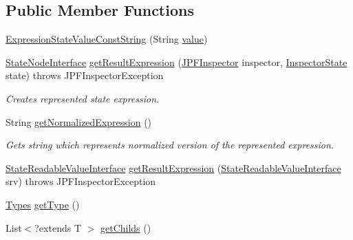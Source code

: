 \subsection*{Public Member Functions}
\begin{DoxyCompactItemize}
\item 
\hyperlink{classgov_1_1nasa_1_1jpf_1_1inspector_1_1server_1_1expression_1_1expressions_1_1_expression_state_value_const_string_abea513aa9ed18d5926a11c186a887f17}{Expression\+State\+Value\+Const\+String} (String \hyperlink{classgov_1_1nasa_1_1jpf_1_1inspector_1_1server_1_1expression_1_1expressions_1_1_expression_state_value_const_string_ac4c2de5d71c2fa57cb8029d1fde8e437}{value})
\item 
\hyperlink{interfacegov_1_1nasa_1_1jpf_1_1inspector_1_1server_1_1programstate_1_1_state_node_interface}{State\+Node\+Interface} \hyperlink{classgov_1_1nasa_1_1jpf_1_1inspector_1_1server_1_1expression_1_1expressions_1_1_expression_state_value_const_string_abae7eb766144fbb9a11336bb9053ad4a}{get\+Result\+Expression} (\hyperlink{classgov_1_1nasa_1_1jpf_1_1inspector_1_1server_1_1jpf_1_1_j_p_f_inspector}{J\+P\+F\+Inspector} inspector, \hyperlink{interfacegov_1_1nasa_1_1jpf_1_1inspector_1_1server_1_1expression_1_1_inspector_state}{Inspector\+State} state)  throws J\+P\+F\+Inspector\+Exception 
\begin{DoxyCompactList}\small\item\em Creates represented state expression. \end{DoxyCompactList}\item 
String \hyperlink{classgov_1_1nasa_1_1jpf_1_1inspector_1_1server_1_1expression_1_1expressions_1_1_expression_state_value_const_string_af7e58cc61aa1cc6e4e6b00f55f18c293}{get\+Normalized\+Expression} ()
\begin{DoxyCompactList}\small\item\em Gets string which represents normalized version of the represented expression. \end{DoxyCompactList}\item 
\hyperlink{interfacegov_1_1nasa_1_1jpf_1_1inspector_1_1server_1_1programstate_1_1_state_readable_value_interface}{State\+Readable\+Value\+Interface} \hyperlink{classgov_1_1nasa_1_1jpf_1_1inspector_1_1server_1_1expression_1_1expressions_1_1_expression_state_value_const_a11bde76b1048dc08cc72bb596c357c7c}{get\+Result\+Expression} (\hyperlink{interfacegov_1_1nasa_1_1jpf_1_1inspector_1_1server_1_1programstate_1_1_state_readable_value_interface}{State\+Readable\+Value\+Interface} srv)  throws J\+P\+F\+Inspector\+Exception 
\item 
\hyperlink{enumgov_1_1nasa_1_1jpf_1_1inspector_1_1server_1_1expression_1_1_types}{Types} \hyperlink{classgov_1_1nasa_1_1jpf_1_1inspector_1_1server_1_1expression_1_1expressions_1_1_expression_state_value_a9317f49f60c166a2f46f90702e75f22e}{get\+Type} ()
\item 
List$<$?extends T $>$ \hyperlink{classgov_1_1nasa_1_1jpf_1_1inspector_1_1server_1_1expression_1_1_expression_state_unary_operator_ad010bcb9c4e2eb584321b5ceba8e1682}{get\+Childs} ()
\end{DoxyCompactItemize}
